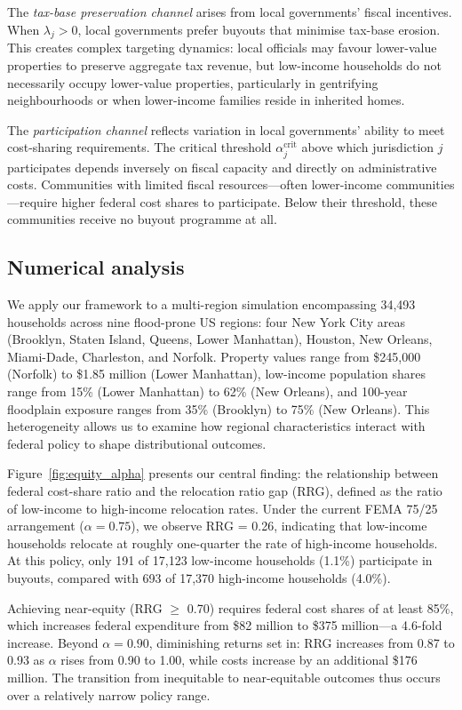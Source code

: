 \documentclass[11pt,letterpaper]{article}
\theoremstyle{definition}
\begin{document}
The \textit{tax-base preservation channel} arises from local governments' fiscal incentives. When $\lambda_j > 0$, local governments prefer buyouts that minimise tax-base erosion. This creates complex targeting dynamics: local officials may favour lower-value properties to preserve aggregate tax revenue, but low-income households do not necessarily occupy lower-value properties, particularly in gentrifying neighbourhoods or when lower-income families reside in inherited homes.

The \textit{participation channel} reflects variation in local governments' ability to meet cost-sharing requirements. The critical threshold $\alpha_j^{\text{crit}}$ above which jurisdiction $j$ participates depends inversely on fiscal capacity and directly on administrative costs. Communities with limited fiscal resources---often lower-income communities---require higher federal cost shares to participate. Below their threshold, these communities receive no buyout programme at all.

\subsection*{Numerical analysis}

We apply our framework to a multi-region simulation encompassing 34,493 households across nine flood-prone US regions: four New York City areas (Brooklyn, Staten Island, Queens, Lower Manhattan), Houston, New Orleans, Miami-Dade, Charleston, and Norfolk. Property values range from \$245,000 (Norfolk) to \$1.85 million (Lower Manhattan), low-income population shares range from 15\% (Lower Manhattan) to 62\% (New Orleans), and 100-year floodplain exposure ranges from 35\% (Brooklyn) to 75\% (New Orleans). This heterogeneity allows us to examine how regional characteristics interact with federal policy to shape distributional outcomes.

Figure~\ref{fig:equity_alpha} presents our central finding: the relationship between federal cost-share ratio and the relocation ratio gap (RRG), defined as the ratio of low-income to high-income relocation rates. Under the current FEMA 75/25 arrangement ($\alpha = 0.75$), we observe RRG = 0.26, indicating that low-income households relocate at roughly one-quarter the rate of high-income households. At this policy, only 191 of 17,123 low-income households (1.1\%) participate in buyouts, compared with 693 of 17,370 high-income households (4.0\%).

Achieving near-equity (RRG $\geq$ 0.70) requires federal cost shares of at least 85\%, which increases federal expenditure from \$82 million to \$375 million---a 4.6-fold increase. Beyond $\alpha = 0.90$, diminishing returns set in: RRG increases from 0.87 to 0.93 as $\alpha$ rises from 0.90 to 1.00, while costs increase by an additional \$176 million. The transition from inequitable to near-equitable outcomes thus occurs over a relatively narrow policy range.
\end{document}
